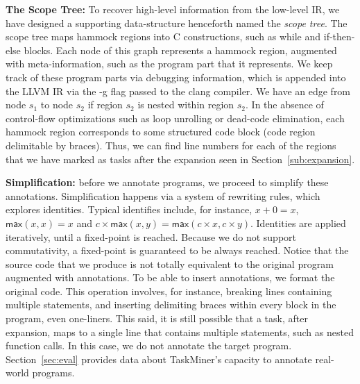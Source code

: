 \documentclass[sigplan,10pt,review,anonymous]{acmart}
\newcommand\Taskminer{\mbox{\textsf{TaskMiner}}}
\begin{document}
\noindent
\textbf{The Scope Tree:}
To recover high-level information from the low-level IR, we have designed a
supporting data-structure henceforth named the {\em scope tree}.
The scope tree maps hammock regions into C constructions, such as
\textsf{while} and \textsf{if-then-else} blocks.
Each node of this graph represents a hammock region, augmented with
meta-information, such as the program part that it represents.
We keep track of these program parts via debugging information, which is
appended into the LLVM IR via the \textsf{-g} flag passed to the \textsf{clang}
compiler.
We have an edge from node $s_1$ to node $s_2$ if region $s_2$ is nested
within region $s_2$.
In the absence of control-flow optimizations such as loop unrolling or
dead-code elimination, each hammock region corresponds to some structured
code block (code region delimitable by braces).
Thus, we can find line numbers for each of the regions that we have marked
as tasks after the expansion seen in Section~\ref{sub:expansion}.

\noindent
\textbf{Simplification:}
before we annotate programs, we proceed to simplify these annotations.
Simplification happens via a system of rewriting rules, which explores 
identities.
Typical identifies include, for instance, $x + 0 = x$,
$\mathsf{max}(x, x) = x$ and $c \times \mathsf{max}(x, y) =
\mathsf{max}(c \times x, c \times y)$.
Identities are applied iteratively, until a fixed-point is reached.
Because we do not support commutativity, a fixed-point is guaranteed to be
always reached.
Notice that the source code that we produce is not totally equivalent to the
original program augmented with annotations.
To be able to insert annotations, we format the original code.
This operation involves, for instance, breaking lines containing multiple
statements, and inserting delimiting braces within every block in the program,
even one-liners.
This said, it is still possible that a task, after expansion, maps to a single
line that contains multiple statements, such as nested function calls.
In this case, we do not annotate the target program.
Section~\ref{sec:eval} provides data about \Taskminer's capacity to
annotate real-world programs.
\end{document}
